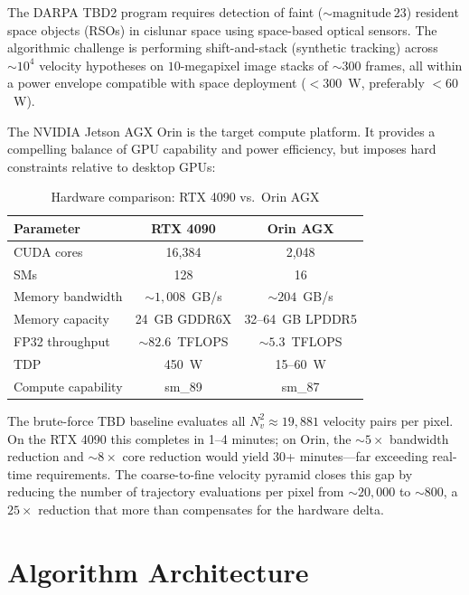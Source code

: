 \documentclass[11pt,letterpaper]{article}
\begin{document}
The DARPA TBD2 program requires detection of faint (${\sim}\text{magnitude}~23$)
resident space objects (RSOs) in cislunar space using space-based optical
sensors. The algorithmic challenge is performing shift-and-stack (synthetic
tracking) across ${\sim}10^4$ velocity hypotheses on $10$-megapixel image
stacks of ${\sim}300$ frames, all within a power envelope compatible with
space deployment ($<300$~W, preferably $<60$~W).

The NVIDIA Jetson AGX Orin is the target compute platform. It provides a
compelling balance of GPU capability and power efficiency, but imposes hard
constraints relative to desktop GPUs:

\begin{table}[h]
\centering
\caption{Hardware comparison: RTX 4090 vs.\ Orin AGX}
\label{tab:hw_compare}
\begin{tabular}{lcc}
\toprule
\textbf{Parameter} & \textbf{RTX 4090} & \textbf{Orin AGX} \\
\midrule
CUDA cores          & 16,384             & 2,048 \\
SMs                 & 128                & 16 \\
Memory bandwidth    & ${\sim}1{,}008$~GB/s & ${\sim}204$~GB/s \\
Memory capacity     & 24~GB GDDR6X       & 32--64~GB LPDDR5 \\
FP32 throughput     & ${\sim}82.6$~TFLOPS & ${\sim}5.3$~TFLOPS \\
TDP                 & 450~W              & 15--60~W \\
Compute capability  & sm\_89             & sm\_87 \\
\bottomrule
\end{tabular}
\end{table}

The brute-force TBD baseline evaluates all $N_v^2 \approx 19{,}881$ velocity
pairs per pixel. On the RTX 4090 this completes in 1--4 minutes; on Orin, the
${\sim}5\times$ bandwidth reduction and ${\sim}8\times$ core reduction would
yield 30+ minutes---far exceeding real-time requirements. The coarse-to-fine
velocity pyramid closes this gap by reducing the number of trajectory
evaluations per pixel from ${\sim}20{,}000$ to ${\sim}800$, a
$25\times$ reduction that more than compensates for the hardware delta.


\section{Algorithm Architecture}
\label{sec:algorithm}
\end{document}
